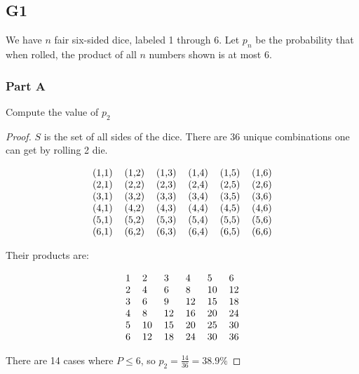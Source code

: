 \subsection*{G1}

We have $n$ fair six-sided dice, labeled 1 through 6. Let $p_n$ be the probability that when rolled, the product of all $n$ numbers shown is at most 6.

\subsubsection*{Part A}

Compute the value of $p_2$

\begin{proof}
    $S$ is the set of all sides of the dice. There are 36 unique combinations one can get by rolling 2 die.

    
    \begin{gather*}
        \begin{tabular}{llllll}
    (1,1) & (1,2) & (1,3) & (1,4) & (1,5) & (1,6) \\
    (2,1) & (2,2) & (2,3) & (2,4) & (2,5) & (2,6) \\
    (3,1) & (3,2) & (3,3) & (3,4) & (3,5) & (3,6) \\
    (4,1) & (4,2) & (4,3) & (4,4) & (4,5) & (4,6) \\
    (5,1) & (5,2) & (5,3) & (5,4) & (5,5) & (5,6) \\
    (6,1) & (6,2) & (6,3) & (6,4) & (6,5) & (6,6)
        \end{tabular}
    \end{gather*}

    Their products are: 

    \begin{gather*}
        \begin{tabular}{llllll}
    1 & 2 & 3 & 4 & 5 & 6 \\
    2 & 4 & 6 & 8 & 10 & 12 \\
    3 & 6 & 9 & 12 & 15 & 18 \\
    4 & 8 & 12 & 16 & 20 & 24 \\
    5 & 10 & 15 & 20 & 25 & 30 \\
    6 & 12 & 18 & 24 & 30 & 36
        \end{tabular}
    \end{gather*}

    There are 14 cases where $P \leq 6$, so $p_2 = \frac{14}{36} = 38.9\%$
\end{proof}

